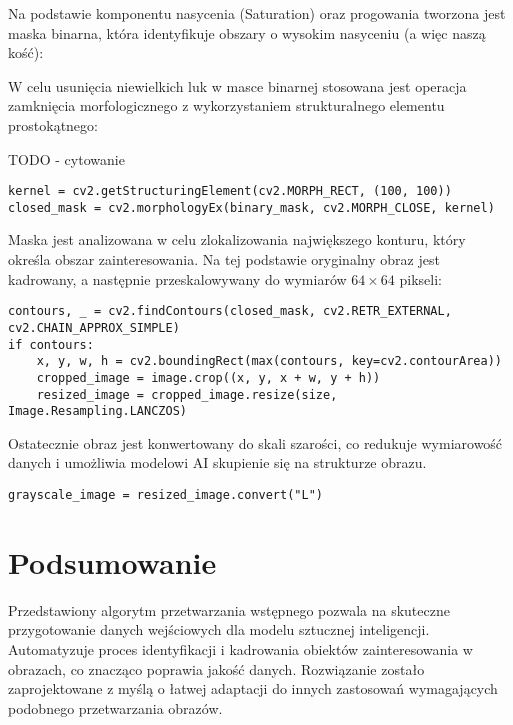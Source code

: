 Na podstawie komponentu nasycenia (Saturation) oraz progowania tworzona jest maska binarna, która identyfikuje obszary o wysokim nasyceniu (a więc naszą kość):

W celu usunięcia niewielkich luk w masce binarnej stosowana jest operacja zamknięcia morfologicznego z wykorzystaniem strukturalnego elementu prostokątnego:


TODO - cytowanie \\

\begin{verbatim}
kernel = cv2.getStructuringElement(cv2.MORPH_RECT, (100, 100))
closed_mask = cv2.morphologyEx(binary_mask, cv2.MORPH_CLOSE, kernel)
\end{verbatim}

Maska jest analizowana w celu zlokalizowania największego konturu, który określa obszar zainteresowania. Na tej podstawie oryginalny obraz jest kadrowany, a następnie przeskalowywany do wymiarów $64 \times 64$ pikseli:

\begin{verbatim}
contours, _ = cv2.findContours(closed_mask, cv2.RETR_EXTERNAL, cv2.CHAIN_APPROX_SIMPLE)
if contours:
    x, y, w, h = cv2.boundingRect(max(contours, key=cv2.contourArea))
    cropped_image = image.crop((x, y, x + w, y + h))
    resized_image = cropped_image.resize(size, Image.Resampling.LANCZOS)
\end{verbatim}

Ostatecznie obraz jest konwertowany do skali szarości, co redukuje wymiarowość danych i umożliwia modelowi AI skupienie się na strukturze obrazu.

\begin{verbatim}
grayscale_image = resized_image.convert("L")
\end{verbatim}

\section{Podsumowanie}

Przedstawiony algorytm przetwarzania wstępnego pozwala na skuteczne przygotowanie danych wejściowych dla modelu sztucznej inteligencji.
Automatyzuje proces identyfikacji i kadrowania obiektów zainteresowania w obrazach, co znacząco poprawia jakość danych.
Rozwiązanie zostało zaprojektowane z myślą o łatwej adaptacji do innych zastosowań wymagających podobnego przetwarzania obrazów.

